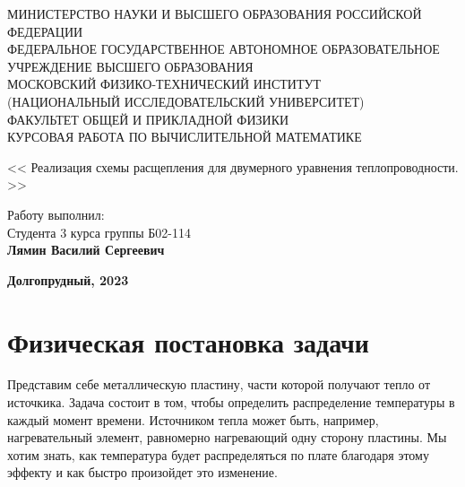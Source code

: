 \documentclass[a4paper]{article}
\begin{document}
\begin{center}
	\hfill \break
	{\small МИНИСТЕРСТВО НАУКИ И ВЫСШЕГО ОБРАЗОВАНИЯ РОССИЙСКОЙ ФЕДЕРАЦИИ}\\
	\hfill \break
	{\small ФЕДЕРАЛЬНОЕ ГОСУДАРСТВЕННОЕ АВТОНОМНОЕ ОБРАЗОВАТЕЛЬНОЕ\\ УЧРЕЖДЕНИЕ ВЫСШЕГО ОБРАЗОВАНИЯ\\ МОСКОВСКИЙ ФИЗИКО-ТЕХНИЧЕСКИЙ ИНСТИТУТ\\ (НАЦИОНАЛЬНЫЙ ИССЛЕДОВАТЕЛЬСКИЙ УНИВЕРСИТЕТ)\\ ФАКУЛЬТЕТ ОБЩЕЙ И ПРИКЛАДНОЙ ФИЗИКИ}\\
	\hfill \break
	\hfill \break
	\hfill \break
	\hfill \break
	\hfill \break
	\normalsize{КУРСОВАЯ РАБОТА ПО ВЫЧИСЛИТЕЛЬНОЙ МАТЕМАТИКЕ}\\
	\hfill \break
	\hfill \break
	\hfill \break
	\hfill \break
	\hfill \break
	\hfill \break
	\hfill \break

	\large{<< Реализация схемы расщепления для двумерного уравнения теплопроводности. >>}\\
\end{center}
\hfill \break
\hfill \break
\hfill \break
\hfill \break
\hfill \break





\begin{flushright}
	\normalsize{Работу выполнил:}\\
	\normalsize{Студента 3 курса группы Б02-114}\\
	\normalsize{\textbf{Лямин Василий Сергеевич}}\\
\end{flushright}



\hfill \break
\hfill \break

\begin{center}
	\normalsize{\textbf{Долгопрудный, 2023}}
\end{center}


\thispagestyle{empty} %

\newpage
\tableofcontents

\newpage

\section{Физическая постановка задачи}
Представим себе металлическую пластину, части которой получают тепло от источкика. Задача состоит в том, чтобы определить распределение температуры в каждый момент времени. Источником тепла может быть, например, нагревательный элемент, равномерно нагревающий одну сторону пластины. Мы хотим знать, как температура будет распределяться по плате благодаря этому эффекту и как быстро произойдет это изменение.
\end{document}
